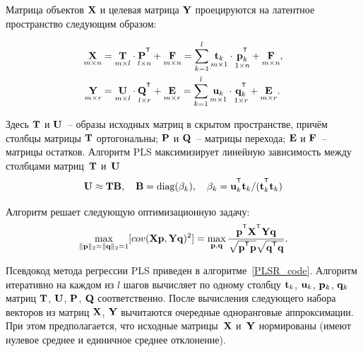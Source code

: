 Матрица объектов $\mathbf{X}$ и целевая матрица $\mathbf{Y}$ проецируются на латентное пространство следующим образом:

\begin{align}
	\label{ch1:eq:PLS_X}
	\underset{m \times n}{\bX} 
	&= \underset{m \times l}{\bT} \cdot \underset{l \times n}{\bP^{\T}} + \underset{m \times n}{\bF} 
	= \sum_{k=1}^l \underset{m \times 1}{\bt_k} \cdot \underset{1 \times n}{\bp_k^{\T}} + \underset{m \times n}{\bF},\\
	\label{ch1:eq:PLS_Y}
	\underset{m \times r}{\bY} 
	&= \underset{m \times l}{\bU} \cdot \underset{l \times r}{\bQ^{\T}} + \underset{m \times r}{\bE}
	=  \sum_{k=1}^l  \underset{m \times 1}{\bu_k} \cdot \underset{1 \times r}{\bq_k^{\T}} +  \underset{m \times r}{\bE}.
\end{align}

Здесь $\mathbf{T}$ и $\mathbf{U}$~-- образы исходных матриц в скрытом пространстве, причём столбцы матрицы $\mathbf{T}$ ортогональны; $\mathbf{P}$ и $\mathbf{Q}$~-- матрицы перехода; $\mathbf{E}$ и $\mathbf{F}$~-- матрицы остатков. 
Алгоритм PLS максимизирует линейную зависимость между столбцами матриц~$\mathbf{T}$ и~$\mathbf{U}$
\begin{equation*}
	\bU \approx \bT \bB, \quad \bB = \text{diag}(\beta_k), \quad \beta_k = \bu_k^{\T}\bt_k / (\bt_k^{\T}\bt_k)
\end{equation*}

Алгоритм решает следующую оптимизационную задачу:
\begin{equation}
	\max_{\|\bp\|_{2}=\|\bq\|_{2}=1}[ cov(\bX \bp, \bY \bq)^{2}] = \max_{\bp, \bq} \frac{\bp^{\T} \bX^{\T} \bY \bq}{\sqrt{\bp^{\T} \bp} \sqrt{\bq^{\T} \bq}}.
	\label{ch1:eq:pls_max_cov}
\end{equation}

Псевдокод метода регрессии PLS приведен в алгоритме~\ref{PLSR_code}.
Алгоритм итеративно на каждом из $l$ шагов вычисляет по одному столбцу $\mathbf{t}_k$, $\mathbf{u}_k$, $\mathbf{p}_k$, $\mathbf{q}_k$ матриц $\mathbf{T}$, $\mathbf{U}$, $\mathbf{P}$, $\mathbf{Q}$ соответственно. 
После вычисления следующего набора векторов из матриц $\mathbf{X}$, $\mathbf{Y}$ вычитаются очередные одноранговые аппроксимации. 
При этом предполагается, что исходные матрицы~$\mathbf{X}$ и~$\mathbf{Y}$ нормированы (имеют нулевое среднее и единичное среднее отклонение).

